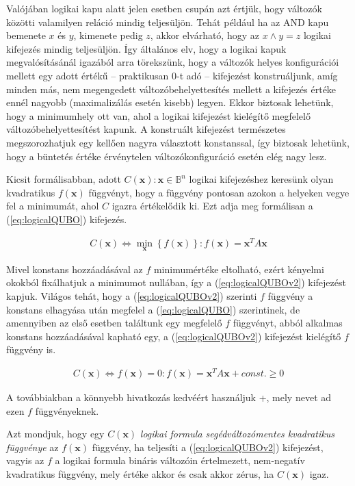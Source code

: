 Valójában logikai kapu alatt jelen esetben csupán azt értjük, hogy változók közötti valamilyen reláció mindig teljesüljön. Tehát például ha az AND kapu bemenete $x$ és $y$, kimenete pedig $z$, akkor elvárható, hogy az $x \wedge y = z$ logikai kifejezés mindig teljesüljön. Így általános elv, hogy a logikai kapuk megvalósításánál igazából arra törekszünk, hogy a változók helyes konfigurációi mellett egy adott értékű -- praktikusan 0-t adó -- kifejezést konstruáljunk, amíg minden más, nem megengedett változóbehelyettesítés mellett a kifejezés értéke ennél nagyobb (maximalizálás esetén kisebb) legyen. Ekkor biztosak lehetünk, hogy a minimumhely ott van, ahol a logikai kifejezést kielégítő megfelelő változóbehelyettesítést kapunk. A konstruált kifejezést természetes megszorozhatjuk egy kellően nagyra választott konstanssal, így biztosak lehetünk, hogy a büntetés értéke érvénytelen változókonfiguráció esetén elég nagy lesz.

Kicsit formálisabban, adott $C(\mathbf{x}) : \mathbf{x} \in \mathbb{B}^n$ logikai kifejezéshez keresünk olyan kvadratikus $f(\mathbf{x})$ függvényt, hogy a függvény pontosan azokon a helyeken vegye fel a minimumát, ahol $C$ igazra értékelődik ki. Ezt adja meg formálisan a (\ref{eq:logicalQUBO}) kifejezés.

\begin{align} \label{eq:logicalQUBO}
	C(\mathbf{x}) \Leftrightarrow  \min_{\mathbf{x}} \left\{ f(\mathbf{x}) \right\}
	: f(\mathbf{x})=\mathbf{x}^T A \mathbf{x}
\end{align}

Mivel konstans hozzáadásával az $f$ minimumértéke eltolható, ezért kényelmi okokból fixálhatjuk a minimumot nullában, így  a (\ref{eq:logicalQUBOv2}) kifejezést kapjuk. Világos tehát, hogy a (\ref{eq:logicalQUBOv2}) szerinti $f$ függvény a konstans elhagyása után megfelel a (\ref{eq:logicalQUBO}) szerintinek, de amennyiben az első esetben találtunk egy megfelelő $f$ függvényt, abból alkalmas konstans hozzáadásával kapható egy, a (\ref{eq:logicalQUBOv2}) kifejezést kielégítő $f$ függvény is.

\begin{align} \label{eq:logicalQUBOv2}
	C(\mathbf{x}) \Leftrightarrow  f(\mathbf{x})=0 
	: f(\mathbf{x})=\mathbf{x}^T A \mathbf{x} + const. \geq 0
\end{align}

A továbbiakban a könnyebb hivatkozás kedvéért használjuk \az+, mely nevet ad ezen $f$ függvényeknek.

\begin{definition}\label{def:kvadFunc}
	Azt mondjuk, hogy egy $C(\mathbf{x})$ \textit{logikai formula segédváltozómentes kvadratikus függvénye} az $f(\mathbf{x})$ függvény, ha teljesíti a (\ref{eq:logicalQUBOv2}) kifejezést, vagyis az $f$ a logikai formula bináris változóin értelmezett, nem-negatív kvadratikus függvény, mely értéke akkor és csak akkor zérus, ha $C(\mathbf{x})$ igaz.	
\end{definition}

